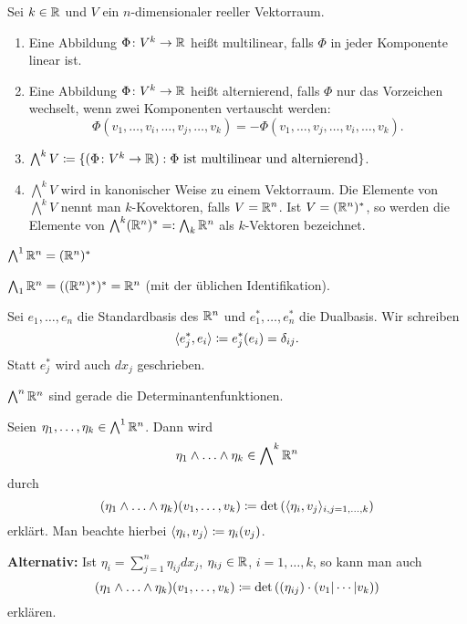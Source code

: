 \documentclass[a4paper,twoside,DIV15,BCOR12mm]{scrbook}
\newcommand{\bw}{\bigwedge\nolimits}
\begin{document}
\begin{definition}
Sei $k\in \mathbb{R}$ und $V$ ein $n$-dimensionaler reeller Vektorraum.
\begin{enumerate}
\item Eine Abbildung $\Phi\colon V^k\to \mathbb{R}$ heißt multilinear, falls $\Phi$ in jeder Komponente linear ist.
\item Eine Abbildung $\Phi\colon V^k\to\mathbb{R}$ heißt alternierend, falls $\Phi$ nur das Vorzeichen wechselt, wenn zwei Komponenten vertauscht werden:
\[
\Phi(v_1,\ldots,v_i,\ldots,v_j,\ldots,v_k) = -\Phi(v_1,\ldots,v_j,\ldots,v_i,\ldots,v_k).
\]
\item $\bw^k V \da\{ (\Phi\colon V^k\to \MdR) : \Phi \text{ ist multilinear und alternierend}\}$.
\item $\bw^k V$ wird in kanonischer Weise zu einem Vektorraum. Die Elemente von $\bw^k V$ nennt man $k$-Kovektoren, falls $V=\mathbb{R}^n$. Ist $V=(\mathbb{R}^n)^*$, so werden die Elemente von $\bw^k (\MdR^n)^* =:  \bw_k\MdR^n$ als $k$-Vektoren bezeichnet.
\end{enumerate}
\end{definition}

\begin{bemerkungen}
\item $\bw^1\MdR^n = (\MdR^n)^*$
\item $\bw_1\MdR^n = ((\MdR^n)^*)^* =\MdR^n$ (mit der üblichen Identifikation).
\item Sei $e_1,\ldots,e_n$ die Standardbasis des $\mathbb{R}^n$ und $e_1^*,\ldots,e_n^*$ die Dualbasis. Wir schreiben
\[
\langle e_j^*,e_i\rangle \da e_j^*(e_i)  =\delta_{ij}.
\]
Statt $e_j^*$ wird auch $d{x_j}$ geschrieben.
\item $\bw^n\MdR^n$ sind gerade die Determinantenfunktionen.
\end{bemerkungen}

\begin{definition}
Seien $\eta_1,\ldots,\eta_k\in \bw^1\MdR^n$. Dann wird
\[
\eta_1\wedge \ldots\wedge \eta_k \in \bw^k\MdR^n
\]
durch
\[
(\eta_1\wedge \ldots\wedge \eta_k)(v_1,\ldots,v_k) \da \det\left( \langle \eta_i,v_j\rangle_{i,j=1,\ldots,k}\right)
\]
erklärt. Man beachte hierbei $\langle\eta_i,v_j\rangle\da \eta_i(v_j)$.

\textbf{Alternativ:} Ist $\eta_i = \sum_{j=1}^n \eta_{ij} dx_j$, $\eta_{ij}\in \mathbb{R}$, $i=1,\ldots,k$, so kann man auch 
\[
(\eta_1\wedge \ldots\wedge \eta_k)(v_1,\ldots,v_k) \da \det\left( (\eta_{ij})\cdot(v_1|\cdots|v_k) \right)
\]
erklären.
\end{definition}
\end{document}
